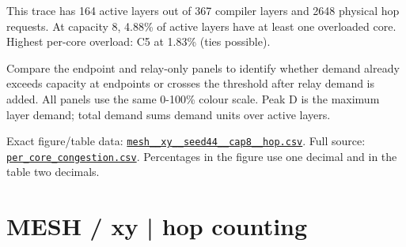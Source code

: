 \documentclass[10pt,a4paper]{article}
\begin{document}
This trace has 164 active layers out of 367 compiler layers and 2648 physical hop requests. At capacity 8, 4.88\% of active layers have at least one overloaded core. Highest per-core overload: C5 at 1.83\% (ties possible).\par
Compare the endpoint and relay-only panels to identify whether demand already exceeds capacity at endpoints or crosses the threshold after relay demand is added. All panels use the same 0-100\% colour scale. Peak D is the maximum layer demand; total demand sums demand units over active layers.\par
Exact figure/table data: \href{\detokenize{file:///home/dhruv-pansuriya/Documents/BTP/Compiler-Driven-ACE/output/pdf/qaoa_methods_congestion/tables/mesh__xy__seed44__cap8__hop.csv}}{\nolinkurl{mesh__xy__seed44__cap8__hop.csv}}. Full source: \href{\detokenize{file:///home/dhruv-pansuriya/Documents/BTP/Compiler-Driven-ACE/results/qaoa_2seed_2026-10-26/congestion/per_core_congestion.csv}}{\nolinkurl{per_core_congestion.csv}}. Percentages in the figure use one decimal and in the table two decimals.\par
\clearpage
\section*{MESH / xy | hop counting}
\end{document}
